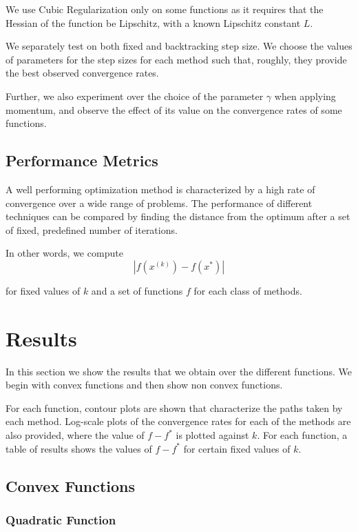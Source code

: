 \documentclass{article}
\begin{document}
We use Cubic Regularization only on some functions as it requires that the Hessian of the function be Lipschitz, with a known Lipschitz constant $L$.

We separately test on both fixed and backtracking step size. We choose the values of parameters for the step sizes for each method such that, roughly, they provide the best observed convergence rates.

Further, we also experiment over the choice of the parameter $\gamma$ when applying momentum, and observe the effect of its value on the convergence rates of some functions.

\subsection{Performance Metrics}
A well performing optimization method is characterized by a high rate of convergence over a wide range of problems. The performance of different techniques can be compared by finding the distance from the optimum after a set of fixed, predefined number of iterations.

In other words, we compute
\begin{equation}
|f(x^{(k)}) - f(x^*)|
\end{equation}

for fixed values of $k$ and a set of functions $f$ for each class of methods.

\section{Results}\label{results}
In this section we show the results that we obtain over the different functions. We begin with convex functions and then show non convex functions.

For each function, contour plots are shown that characterize the paths taken by each method. Log-scale plots of the convergence rates for each of the methods are also provided, where the value of $f-f^*$ is plotted against $k$. For each function, a table of results shows the values of $f-f^*$ for certain fixed values of $k$.

\subsection{Convex Functions}

\subsubsection{Quadratic Function}
\end{document}
